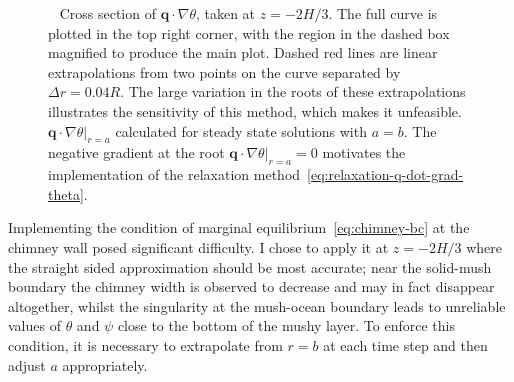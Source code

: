 \documentclass[11pt]{proc}
\begin{document}
\begin{figure}[t!]
\centering
\captionsetup[subfigure]{position=top,singlelinecheck=off,justification=raggedright, aboveskip=-12pt,belowskip=12pt}
\begin{subfigure}[t]{.48\linewidth}
       	\centering
       	 \caption{}
       	\setlength\figureheight{5cm} 
	\setlength\figurewidth{7cm}
	
       	\label{subfig:q-dot-grad-theta}
\end{subfigure}
\quad
\captionsetup[subfigure]{aboveskip=-18pt}
\begin{subfigure}[t]{.48\linewidth}
       	\centering
        	\caption{}
      	\setlength\figureheight{5cm} 
	\setlength\figurewidth{6.5cm}
	
    	\label{subfig:q-dot-grad-theta-root}
\end{subfigure}
\caption{~ Cross section of $\mathbf{q} \cdot \nabla \theta$, taken at $z=-2H/3$. The full curve is plotted in the top right corner, with the region in the dashed box magnified to produce the main plot. Dashed red lines are linear extrapolations from two points on the curve separated by $\Delta r = 0.04R$. The large variation in the roots of these extrapolations illustrates the sensitivity of this method, which makes it unfeasible.~ $ \left. \mathbf{q} \cdot \nabla \theta \right|_{r=a}$ calculated for steady state solutions with $a=b$. The negative gradient at the root $ \left. \mathbf{q} \cdot \nabla \theta \right|_{r=a} = 0$ motivates the implementation of the relaxation method~\eqref{eq:relaxation-q-dot-grad-theta}. }
\label{fig:free-boundary-method}  

\end{figure}

Implementing the condition of marginal equilibrium~\eqref{eq:chimney-bc} at the chimney wall posed significant difficulty. I chose to apply it at $z = - 2H/3$ where the straight sided approximation should be most accurate; near the solid-mush boundary the chimney width is observed to decrease and may in fact disappear altogether, whilst the singularity at the mush-ocean boundary leads to unreliable values of $\theta$ and $\psi$ close to the bottom of the mushy layer. To enforce this condition, it is necessary to extrapolate from $r=b$ at each time step and then adjust $a$ appropriately. 
\end{document}
